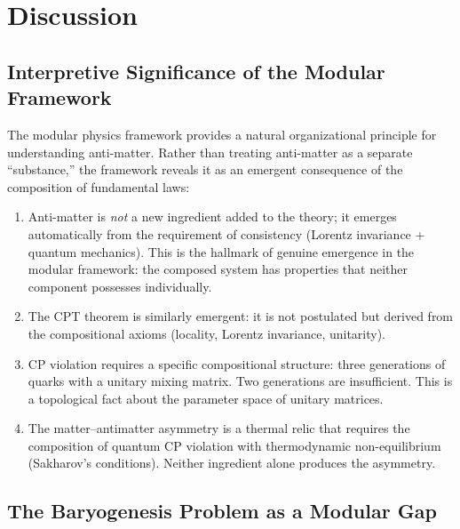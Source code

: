 \documentclass[12pt]{article}
\theoremstyle{definition}
\theoremstyle{remark}
\begin{document}
\section{Discussion}
\label{sec:discussion}

\subsection{Interpretive Significance of the Modular Framework}

The modular physics framework provides a natural organizational principle for
understanding anti-matter. Rather than treating anti-matter as a separate ``substance,''
the framework reveals it as an emergent consequence of the composition of fundamental
laws:

\begin{enumerate}
    \item Anti-matter is \emph{not} a new ingredient added to the theory; it emerges
    automatically from the requirement of consistency (Lorentz invariance + quantum mechanics).
    This is the hallmark of genuine emergence in the modular framework: the composed
    system has properties that neither component possesses individually.

    \item The CPT theorem is similarly emergent: it is not postulated but derived
    from the compositional axioms (locality, Lorentz invariance, unitarity).

    \item CP violation requires a specific compositional structure: three generations
    of quarks with a unitary mixing matrix. Two generations are insufficient.
    This is a topological fact about the parameter space of unitary matrices.

    \item The matter--antimatter asymmetry is a thermal relic that requires the
    composition of quantum CP violation with thermodynamic non-equilibrium
    (Sakharov's conditions). Neither ingredient alone produces the asymmetry.
\end{enumerate}

\subsection{The Baryogenesis Problem as a Modular Gap}
\end{document}
